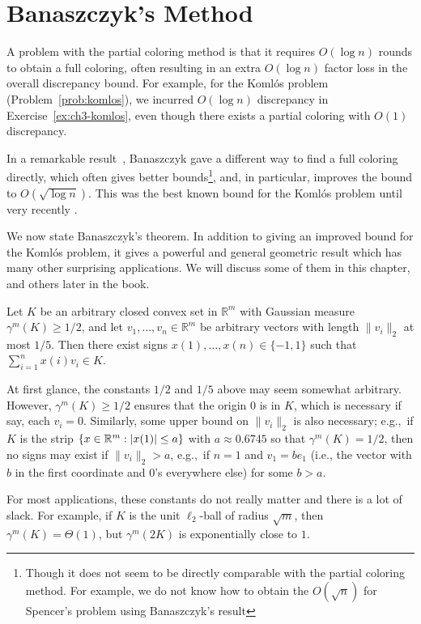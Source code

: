 
\chapter{Banaszczyk's Method }\label{ch:bana-intro}

A problem with the partial coloring method is that it requires $O(\log
n)$ rounds to obtain a full coloring, often resulting in an extra
$O(\log n)$ factor loss in the overall discrepancy bound. For example,
for the Koml\'os problem  (Problem~\ref{prob:komlos}), we incurred $O(\log n)$ discrepancy in
Exercise~\ref{ex:ch3-komlos}, even though there exists a partial
coloring with  $O(1)$ discrepancy.

In a remarkable result~\cite{Bana98}, Banaszczyk gave a different way
to find a full coloring directly, which often gives better
bounds\footnote{Though it does not seem to be directly comparable with
  the partial coloring method. For example, we do not know how to
  obtain the $O(\sqrt{n})$ for Spencer's problem using Banaszczyk's
  result}, and, in particular, improves the bound 
to $O(\sqrt{\log n})$. 
This was the best known bound for the Koml\'os problem until very recently \cite{bansaljiang2025}.

 We now state Banaszczyk's theorem. 
 In  addition to giving an improved bound for the Koml\'os problem,
 it gives a powerful and general geometric result which has many other
 surprising applications. We  will discuss some of them in this chapter, and others later in the book. %

\begin{theorem}\label{thm:bana}
Let $K$ be an arbitrary closed convex set in $\mathbb{R}^m$ with Gaussian measure $\gamma^m(K)\ge 1/2$, and let $v_1,\dots,v_n\in\mathbb{R}^m$ be arbitrary vectors with length $\|v_i\|_2$  at most $1/5$. Then there exist signs $x(1),\ldots,x(n) \in \{-1,1\}$ such that $\sum_{i=1}^n x(i) v_i \in K$. 
\end{theorem}

\begin{remark}
    At first glance, the constants $1/2$ and $1/5$ above may seem
    somewhat arbitrary. However, $\gamma^m(K)\geq 1/2$ ensures that
    the origin ${0}$ is in $K$, which is necessary if say, each
    $v_i={0}$. Similarly, some upper bound on $\|v_i\|_2$ is also
    necessary; e.g.,~if $K$ is the strip $\{x \in \mathbb{R}^m: |x(1)|\leq
    a\}$ with $a\approx 0.6745$ so that $\gamma^m(K)=1/2$, then no
    signs may exist if $\|v_i\|_2>a$, e.g.,~if $n=1$ and $v_1=be_1$
    (i.e., the vector with $b$ in the first coordinate and $0$'s
    everywhere else) for some $b>a$.
\end{remark}
For most applications, these constants do not really matter and there is a lot of slack. For example, if $K$ is the unit $\ell_2$-ball of radius $\sqrt{m}$, then $\gamma^{m}(K) = \Theta(1)$, but $\gamma^m(2K)$ is exponentially close to $1$.

